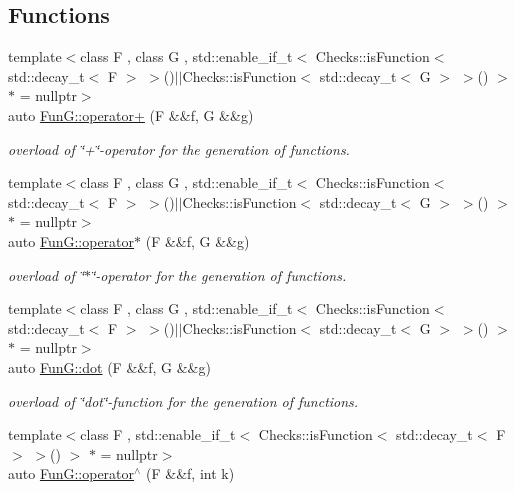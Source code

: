 \subsection*{Functions}
\begin{DoxyCompactItemize}
\item 
{\footnotesize template$<$class F , class G , std\-::enable\-\_\-if\-\_\-t$<$ Checks\-::is\-Function$<$ std\-::decay\-\_\-t$<$ F $>$ $>$()$\vert$$\vert$\-Checks\-::is\-Function$<$ std\-::decay\-\_\-t$<$ G $>$ $>$() $>$ $\ast$  = nullptr$>$ }\\auto \hyperlink{namespaceFunG_a24bb5d609b022030afda2d8589cf5509}{Fun\-G\-::operator+} (F \&\&f, G \&\&g)
\begin{DoxyCompactList}\small\item\em overload of \char`\"{}+\char`\"{}-\/operator for the generation of functions. \end{DoxyCompactList}\item 
{\footnotesize template$<$class F , class G , std\-::enable\-\_\-if\-\_\-t$<$ Checks\-::is\-Function$<$ std\-::decay\-\_\-t$<$ F $>$ $>$()$\vert$$\vert$\-Checks\-::is\-Function$<$ std\-::decay\-\_\-t$<$ G $>$ $>$() $>$ $\ast$  = nullptr$>$ }\\auto \hyperlink{namespaceFunG_a267562e725c73ece1c1d057b5f29511f}{Fun\-G\-::operator$\ast$} (F \&\&f, G \&\&g)
\begin{DoxyCompactList}\small\item\em overload of \char`\"{}$\ast$\char`\"{}-\/operator for the generation of functions. \end{DoxyCompactList}\item 
{\footnotesize template$<$class F , class G , std\-::enable\-\_\-if\-\_\-t$<$ Checks\-::is\-Function$<$ std\-::decay\-\_\-t$<$ F $>$ $>$()$\vert$$\vert$\-Checks\-::is\-Function$<$ std\-::decay\-\_\-t$<$ G $>$ $>$() $>$ $\ast$  = nullptr$>$ }\\auto \hyperlink{namespaceFunG_ac73eb907f3d29a9ea60513a43c658270}{Fun\-G\-::dot} (F \&\&f, G \&\&g)
\begin{DoxyCompactList}\small\item\em overload of \char`\"{}dot\char`\"{}-\/function for the generation of functions. \end{DoxyCompactList}\item 
{\footnotesize template$<$class F , std\-::enable\-\_\-if\-\_\-t$<$ Checks\-::is\-Function$<$ std\-::decay\-\_\-t$<$ F $>$ $>$() $>$ $\ast$  = nullptr$>$ }\\auto \hyperlink{namespaceFunG_a94273e3ea80324e591bb98ae3c051221}{Fun\-G\-::operator$^\wedge$} (F \&\&f, int k)

\end{DoxyCompactItemize}
